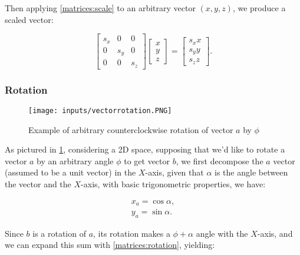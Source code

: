 \documentclass[cic,tc,english]{iiufrgs}
\begin{document}
Then applying \cref{matrices:scale} to an arbitrary vector $(x,y,z)$, we produce a scaled vector:

\begin{equation}
    \begin{bmatrix}
        s_x & 0 & 0 \\
        0 & s_y & 0 \\
        0 & 0 & s_z
    \end{bmatrix}
    \begin{bmatrix}
        x \\
        y \\
        z
    \end{bmatrix}
    =
    \begin{bmatrix}
        s_xx \\
        s_yy \\
        s_zz
    \end{bmatrix}
    .
\end{equation}

\subsubsection{Rotation}
\label{rotationmatrixchapter}
\begin{figure}[hbt!]
    \caption{Example of arbitrary counterclockwise rotation of vector $a$ by $\phi$}
    \begin{center}
        \texttt{[image: inputs/vectorrotation.PNG]}
    \end{center}
    \label{rotationmatrix}
\end{figure}

As pictured in \cref{rotationmatrix}, considering a 2D space, supposing that we'd like to rotate a vector $a$ by an arbitrary angle $\phi$ to get vector $b$, we first decompose the $a$ vector (assumed to be a unit vector) in the $X$-axis, given that $\alpha$ is the angle between the vector and the $X$-axis, with basic trigonometric properties, we have:

\begin{equation}
    \label{matrices:rotation}
    \begin{array}{c}
        x_a = \cos\alpha, \\
        y_a = \sin\alpha.
    \end{array}
\end{equation}

Since $b$ is a rotation of $a$, its rotation makes a $\phi + \alpha$ angle with the $X$-axis, and we can expand this sum with \cref{matrices:rotation}, yielding:
\end{document}

